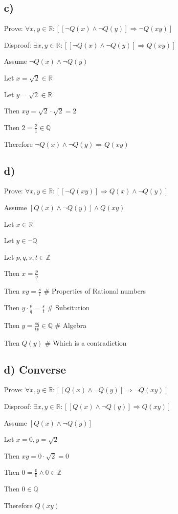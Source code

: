 \documentclass[11pt, oneside]{article}   	%
\begin{document}
\subsection{c)}


Prove: $\forall x, y \in \mathbb{R} : [ [ \neg Q(x) \land \neg Q(y) ] \Rightarrow \neg Q(xy)] $

Disproof: $\exists x, y \in \mathbb{R} : [ [ \neg Q(x) \land \neg Q(y)]  \Rightarrow Q(xy)] $

Assume $ \neg Q(x) \land  \neg Q(y) $

Let $ x = \sqrt{2} \in \mathbb{R} $

Let $ y = \sqrt{2} \in \mathbb{R} $

\indent \indent Then $ xy = \sqrt{2} \cdot \sqrt{2} = 2$ 

\indent \indent Then $ 2 = \frac{2}{1} \in \mathbb{Q}$ 

\indent \indent Therefore $  \neg Q(x) \land \neg Q(y) \Rightarrow Q(xy)$ 

\subsection{d)}


Prove: $\forall x, y \in \mathbb{R} : [ [ \neg Q(xy) ] \Rightarrow Q(x) \land \neg Q(y)] $

Assume $ [Q(x) \land \neg Q(y)] \land Q(xy)$

Let $ x \in \mathbb{R} $

Let $ y \in \neg \mathbb{Q} $

Let $ p,q, s, t\in \mathbb{Z} $

\indent \indent Then $ x = \frac{p}{q} $ 

\indent \indent Then $ xy = \frac{s}{t}$ 
\# Properties of Rational numbers

\indent \indent Then $ y \cdot \frac{p}{q} = \frac{s}{t} $ 
\# Subsitution

\indent \indent Then $ y = \frac{sq}{tp} \in \mathbb{Q}$
\# Algebra

\indent \indent Then $ Q(y)$
\# Which is a contradiction 


\subsection{d) Converse} 

Prove: $\forall x, y \in \mathbb{R} : [ [ Q(x) \land \neg Q(y) ] \Rightarrow \neg Q(xy)] $

Disproof: $\exists x, y \in \mathbb{R} : [ [ Q(x) \land \neg Q(y) ] \Rightarrow Q(xy)] $

 Assume $ [Q(x) \land \neg Q(y)]$
 
 Let $ x = 0, y = \sqrt{2}$
 
 \indent \indent Then $ xy = 0 \cdot \sqrt{2} = 0 $
 
 \indent \indent Then $ 0 = \frac{0}{0} \land 0 \in \mathbb{Z} $
  
 \indent \indent Then $ 0 \in \mathbb{Q} $
 
  \indent \indent Therefore $ Q(xy) $
\end{document}
